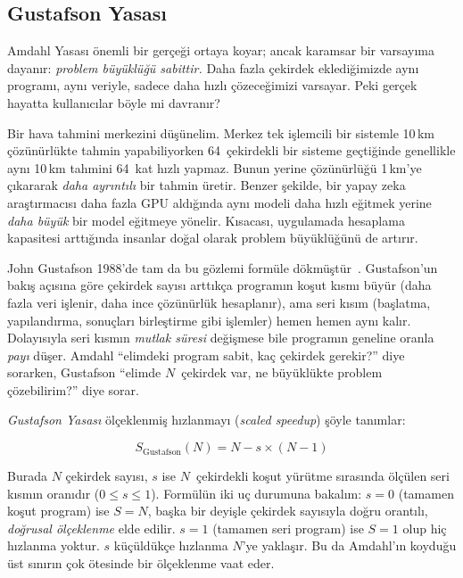 \subsection{Gustafson Yasası}
\label{subsec:gustafson}

Amdahl Yasası önemli bir gerçeği ortaya koyar; ancak karamsar bir varsayıma dayanır: \emph{problem büyüklüğü sabittir.} Daha fazla çekirdek eklediğimizde aynı programı, aynı veriyle, sadece daha hızlı çözeceğimizi varsayar. Peki gerçek hayatta kullanıcılar böyle mi davranır?

Bir hava tahmini merkezini düşünelim. Merkez tek işlemcili bir sistemle 10\,km çözünürlükte tahmin yapabiliyorken 64~çekirdekli bir sisteme geçtiğinde genellikle aynı 10\,km tahmini 64~kat hızlı yapmaz. Bunun yerine çözünürlüğü 1\,km'ye çıkararak \emph{daha ayrıntılı} bir tahmin üretir. Benzer şekilde, bir yapay zeka araştırmacısı daha fazla GPU aldığında aynı modeli daha hızlı eğitmek yerine \emph{daha büyük} bir model eğitmeye yönelir. Kısacası, uygulamada hesaplama kapasitesi arttığında insanlar doğal olarak problem büyüklüğünü de artırır.

John Gustafson 1988'de tam da bu gözlemi formüle dökmüştür~\cite{gustafson1988}. Gustafson'un bakış açısına göre çekirdek sayısı arttıkça programın koşut kısmı büyür (daha fazla veri işlenir, daha ince çözünürlük hesaplanır), ama seri kısım (başlatma, yapılandırma, sonuçları birleştirme gibi işlemler) hemen hemen aynı kalır. Dolayısıyla seri kısmın \emph{mutlak süresi} değişmese bile programın geneline oranla \emph{payı} düşer. Amdahl ``elimdeki program sabit, kaç çekirdek gerekir?'' diye sorarken, Gustafson ``elimde $N$~çekirdek var, ne büyüklükte problem çözebilirim?'' diye sorar.

\emph{Gustafson Yasası} ölçeklenmiş hızlanmayı (\emph{scaled speedup}) şöyle tanımlar:

\begin{equation}
S_{\text{Gustafson}}(N) = N - s \times (N - 1)
\label{eq:gustafson}
\end{equation}

\noindent Burada $N$ çekirdek sayısı, $s$ ise $N$~çekirdekli koşut yürütme sırasında ölçülen seri kısmın oranıdır ($0 \le s \le 1$). Formülün iki uç durumuna bakalım: $s = 0$ (tamamen koşut program) ise $S = N$, başka bir deyişle çekirdek sayısıyla doğru orantılı, \emph{doğrusal ölçeklenme} elde edilir. $s = 1$ (tamamen seri program) ise $S = 1$ olup hiç hızlanma yoktur. $s$ küçüldükçe hızlanma $N$'ye yaklaşır. Bu da Amdahl'ın koyduğu üst sınırın çok ötesinde bir ölçeklenme vaat eder.

